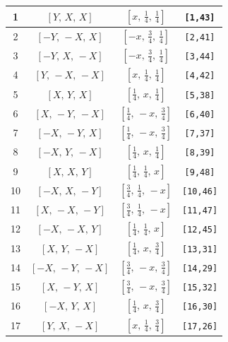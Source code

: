 \documentclass[fleqn,8pt]{jsarticle}
\begin{document}
\begin{longtable}{cccc}
1 & $\left[ Y,\, X,\, X \right]$ & $\left[ x,\, \frac{1}{4},\, \frac{1}{4} \right]$ & {\tt [1,43]} \\ \hline
2 & $\left[ - Y,\, - X,\, X \right]$ & $\left[ - x,\, \frac{3}{4},\, \frac{1}{4} \right]$ & {\tt [2,41]} \\ \hline
3 & $\left[ - Y,\, X,\, - X \right]$ & $\left[ - x,\, \frac{3}{4},\, \frac{1}{4} \right]$ & {\tt [3,44]} \\ \hline
4 & $\left[ Y,\, - X,\, - X \right]$ & $\left[ x,\, \frac{1}{4},\, \frac{1}{4} \right]$ & {\tt [4,42]} \\ \hline
5 & $\left[ X,\, Y,\, X \right]$ & $\left[ \frac{1}{4},\, x,\, \frac{1}{4} \right]$ & {\tt [5,38]} \\ \hline
6 & $\left[ X,\, - Y,\, - X \right]$ & $\left[ \frac{1}{4},\, - x,\, \frac{3}{4} \right]$ & {\tt [6,40]} \\ \hline
7 & $\left[ - X,\, - Y,\, X \right]$ & $\left[ \frac{1}{4},\, - x,\, \frac{3}{4} \right]$ & {\tt [7,37]} \\ \hline
8 & $\left[ - X,\, Y,\, - X \right]$ & $\left[ \frac{1}{4},\, x,\, \frac{1}{4} \right]$ & {\tt [8,39]} \\ \hline
9 & $\left[ X,\, X,\, Y \right]$ & $\left[ \frac{1}{4},\, \frac{1}{4},\, x \right]$ & {\tt [9,48]} \\ \hline
10 & $\left[ - X,\, X,\, - Y \right]$ & $\left[ \frac{3}{4},\, \frac{1}{4},\, - x \right]$ & {\tt [10,46]} \\ \hline
11 & $\left[ X,\, - X,\, - Y \right]$ & $\left[ \frac{3}{4},\, \frac{1}{4},\, - x \right]$ & {\tt [11,47]} \\ \hline
12 & $\left[ - X,\, - X,\, Y \right]$ & $\left[ \frac{1}{4},\, \frac{1}{4},\, x \right]$ & {\tt [12,45]} \\ \hline
13 & $\left[ X,\, Y,\, - X \right]$ & $\left[ \frac{1}{4},\, x,\, \frac{3}{4} \right]$ & {\tt [13,31]} \\ \hline
14 & $\left[ - X,\, - Y,\, - X \right]$ & $\left[ \frac{3}{4},\, - x,\, \frac{3}{4} \right]$ & {\tt [14,29]} \\ \hline
15 & $\left[ X,\, - Y,\, X \right]$ & $\left[ \frac{3}{4},\, - x,\, \frac{3}{4} \right]$ & {\tt [15,32]} \\ \hline
16 & $\left[ - X,\, Y,\, X \right]$ & $\left[ \frac{1}{4},\, x,\, \frac{3}{4} \right]$ & {\tt [16,30]} \\ \hline
17 & $\left[ Y,\, X,\, - X \right]$ & $\left[ x,\, \frac{1}{4},\, \frac{3}{4} \right]$ & {\tt [17,26]} \\ \hline

\end{longtable}
\end{document}
